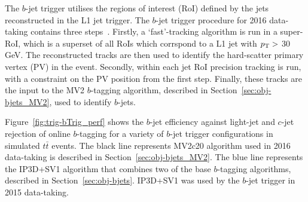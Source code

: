 The $b$-jet trigger utilises the regions of interest (RoI) defined by the jets reconstructed in the L1 jet trigger.
The $b$-jet trigger procedure for 2016 data-taking contains three steps~\cite{trig-bTrig_desc}.
Firstly, a `fast'-tracking algorithm is run in a super-RoI,
which is a superset of all RoIs which corrspond to a L1 jet with $p_{\mathrm{T}}{} >$ 30 GeV.
The reconstructed tracks are then used to identify the hard-scatter primary vertex (PV) in the event.
Secondly, within each jet RoI precision tracking is run, with a constraint on the PV position from the first step.
Finally, these tracks are the input to the MV2 $b$-tagging algorithm, described in Section~\ref{sec:obj-bjets_MV2}, used to identify $b$-jets.

Figure~\ref{fig:trig-bTrig_perf} shows the $b$-jet efficiency against light-jet and $c$-jet rejection
of online $b$-tagging for a variety of $b$-jet trigger configurations in simulated $t\bar{t}$ events.
The black line represents MV2c20 algorithm used in 2016 data-taking is described in Section~\ref{sec:obj-bjets_MV2}.
The blue line represents the IP3D+SV1 algorithm that combines two of the base $b$-tagging algorithms, described in Section~\ref{sec:obj-bjets}.
IP3D+SV1 was used by the $b$-jet trigger in 2015 data-taking.

